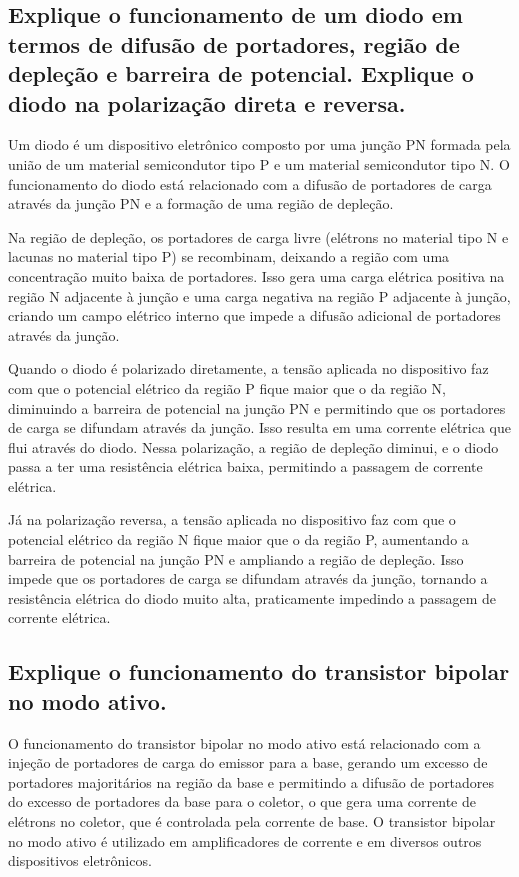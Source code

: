 \subsection{Explique o funcionamento de um diodo em termos de difusão de portadores, região de 
depleção e barreira de potencial. Explique o diodo na polarização direta e reversa.}
Um diodo é um dispositivo eletrônico composto por uma junção PN formada pela união de um material semicondutor tipo P e um material semicondutor tipo N. O funcionamento do diodo está relacionado com a difusão de portadores de carga através da junção PN e a formação de uma região de depleção.

Na região de depleção, os portadores de carga livre (elétrons no material tipo N e lacunas no material tipo P) se recombinam, deixando a região com uma concentração muito baixa de portadores. Isso gera uma carga elétrica positiva na região N adjacente à junção e uma carga negativa na região P adjacente à junção, criando um campo elétrico interno que impede a difusão adicional de portadores através da junção.

Quando o diodo é polarizado diretamente, a tensão aplicada no dispositivo faz com que o potencial elétrico da região P fique maior que o da região N, diminuindo a barreira de potencial na junção PN e permitindo que os portadores de carga se difundam através da junção. Isso resulta em uma corrente elétrica que flui através do diodo. Nessa polarização, a região de depleção diminui, e o diodo passa a ter uma resistência elétrica baixa, permitindo a passagem de corrente elétrica.

Já na polarização reversa, a tensão aplicada no dispositivo faz com que o potencial elétrico da região N fique maior que o da região P, aumentando a barreira de potencial na junção PN e ampliando a região de depleção. Isso impede que os portadores de carga se difundam através da junção, tornando a resistência elétrica do diodo muito alta, praticamente impedindo a passagem de corrente elétrica.
\subsection{Explique o funcionamento do transistor bipolar no modo ativo.}
O funcionamento do transistor bipolar no modo ativo está relacionado com a injeção de portadores de carga do emissor para a base, gerando um excesso de portadores majoritários na região da base e permitindo a difusão de portadores do excesso de portadores da base para o coletor, o que gera uma corrente de elétrons no coletor, que é controlada pela corrente de base. O transistor bipolar no modo ativo é utilizado em amplificadores de corrente e em diversos outros dispositivos eletrônicos.
